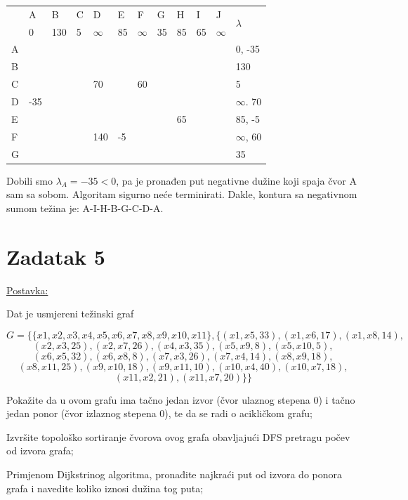 \documentclass[12pt]{article}
\begin{document}
\begin{table}[hp]
\centering
\begin{tabular}{|l|l|l|l|l|l|l|l|l|l|l|l|}
\hline
\multirow{2}{*}{} & A & B & C & D & E & F & G & H & I & J & \multirow{2}{*}{$\lambda$} \\ \cline{2-11}
 & 0 & 130 & 5 & $\infty$ & 85 & $\infty$ & 35 & 85 & 65 & $\infty$ &  \\ \hline
A &  &  &  &  &  &  &  &  &  &  & 0, -35 \\ \hline
B &  &  &  &  &  &  &  &  &  &  & 130 \\ \hline
C &  &  &  & 70 &  & 60 &  &  &  &  & 5 \\ \hline
D & -35 &  &  &  &  &  &  &  &  &  & $\infty$. 70 \\ \hline
E &  &  &  &  &  &  &  & 65 &  &  & 85, -5 \\ \hline
F &  &  &  & 140 & -5 &  &  &  &  &  & $\infty$, 60 \\ \hline
G &  &  &  &  &  &  &  &  &  &  & 35 \\ \hline
\end{tabular}
\end{table}

Dobili smo $\lambda_A = -35 < 0$, pa je pronađen put negativne dužine koji spaja čvor A sam sa sobom. Algoritam sigurno neće terminirati. Dakle, kontura sa negativnom sumom težina je: A-I-H-B-G-C-D-A.

\newpage

\section*{Zadatak 5\label{Z5}}
\underline{Postavka:}

Dat je usmjereni težinski graf

$$G = \{\{x1, x2, x3, x4, x5, x6, x7, x8, x9, x10, x11\}, \{(x1, x5, 33), (x1, x6, 17), (x1, x8, 14), $$
$$(x2, x3, 25), (x2, x7, 26), (x4, x3, 35), (x5, x9, 8), (x5, x10, 5), $$
$$(x6, x5, 32), (x6, x8, 8), (x7, x3, 26), (x7, x4, 14), (x8, x9, 18), $$
$$(x8, x11, 25), (x9, x10, 18), (x9, x11, 10), (x10, x4, 40), (x10, x7, 18), $$
$$(x11, x2, 21), (x11, x7, 20)\}\}$$

Pokažite da u ovom grafu ima tačno jedan izvor (čvor ulaznog stepena 0) i tačno jedan ponor (čvor izlaznog stepena 0), te da se radi o acikličkom grafu;

Izvršite topološko sortiranje čvorova ovog grafa obavljajući DFS pretragu počev od izvora grafa;

Primjenom Dijkstrinog algoritma, pronađite najkraći put od izvora do ponora grafa i navedite koliko iznosi dužina tog puta;
\end{document}
